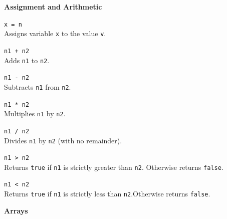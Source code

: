 \documentclass[10pt,twocolumn]{article}
\begin{document}
\noindent\textbf{\large Assignment and Arithmetic}
\begin{description}

\item{\texttt{x = n}} \ \\[.25em]
  Assigns variable \texttt{x} to the value \texttt{v}.

\item{\texttt{n1 + n2}} \ \\[.25em]
  Adds \texttt{n1} to \texttt{n2}. 

\item{\texttt{n1 - n2}} \ \\[.25em]
  Subtracts \texttt{n1} from \texttt{n2}. 

\item{\texttt{n1 * n2}} \ \\[.25em]
  Multiplies \texttt{n1} by \texttt{n2}. 

\item{\texttt{n1 / n2}} \ \\[.25em]
  Divides \texttt{n1} by \texttt{n2} (with no remainder).
  
 \item{\texttt{n1 > n2}} \ \\[.25em]
Returns \texttt{true} if \texttt{n1} is strictly greater than \texttt{n2}. Otherwise returns \texttt{false}.

 \item{\texttt{n1 < n2}} \ \\[.25em]
Returns \texttt{true} if \texttt{n1} is strictly less than \texttt{n2}.Otherwise returns \texttt{false}.
\end{description}

\medskip

\noindent\textbf{\large Arrays}
\end{document}
